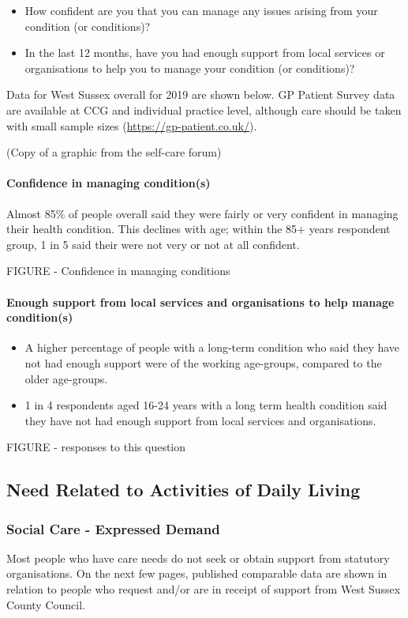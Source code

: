 \begin{itemize}[noitemsep]
    \item How confident are you that you can manage any issues arising from your condition (or conditions)?
    \item In the last 12 months, have you had enough support from local services or organisations to help you to manage your condition (or conditions)?
\end{itemize}

Data for West Sussex overall for 2019 are shown below. GP Patient Survey data are available at CCG and individual practice level, although care should be taken with small sample sizes (\url{https://gp-patient.co.uk/}).

(Copy of a graphic from the self-care forum)

\paragraph{Confidence in managing condition(s)} Almost 85\% of people overall said they were fairly or very confident in managing their health condition. This declines with age; within the 85+ years respondent group, 1 in 5 said their were not very or not at all confident.

FIGURE - Confidence in managing conditions

\paragraph{Enough support from local services and organisations to help manage condition(s)} 
\begin{itemize}
    \item A higher percentage of people with a long-term condition who said they have not had enough support were of the working age-groups, compared to the older age-groups.
    \item 1 in 4 respondents aged 16-24 years with a long term health condition said they have not had enough support from local services and organisations.
\end{itemize}

FIGURE - responses to this question

\subsection{Need Related to Activities of Daily Living}
\subsubsection{Social Care - Expressed Demand}
Most people who have care needs do not seek or obtain support from statutory organisations. On the next few pages, published comparable data are shown in relation to people who request and/or are in receipt of support from West Sussex County Council.

